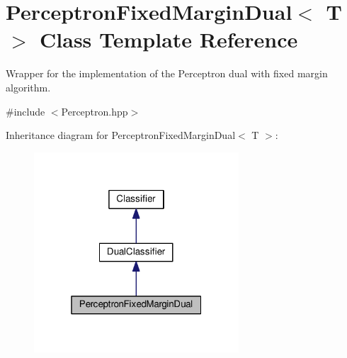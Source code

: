 \hypertarget{class_perceptron_fixed_margin_dual}{}\section{Perceptron\+Fixed\+Margin\+Dual$<$ T $>$ Class Template Reference}
\label{class_perceptron_fixed_margin_dual}


Wrapper for the implementation of the Perceptron dual with fixed margin algorithm.  




{\ttfamily \#include $<$Perceptron.\+hpp$>$}



Inheritance diagram for Perceptron\+Fixed\+Margin\+Dual$<$ T $>$\+:\nopagebreak
\begin{figure}[H]
\begin{center}
\leavevmode
\includegraphics[width=217pt]{class_perceptron_fixed_margin_dual__inherit__graph}
\end{center}
\end{figure}


